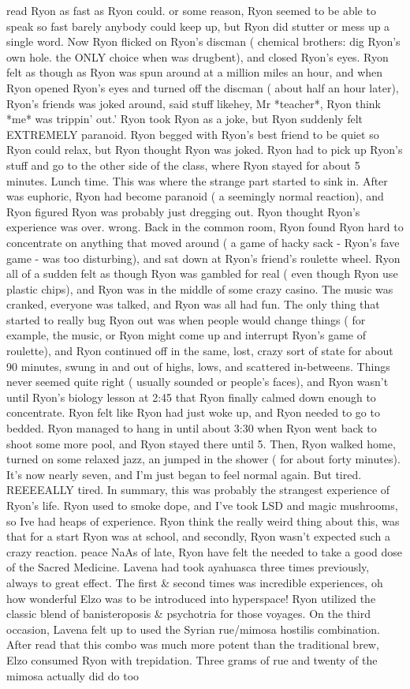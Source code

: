 \documentclass[12pt]{book}
\begin{document}
read Ryon as fast as Ryon could. or some reason, Ryon seemed to be able to speak so fast barely anybody could keep up, but Ryon did stutter or mess up a single word. Now Ryon flicked on Ryon's discman ( chemical brothers: dig Ryon's own hole. the ONLY choice when was drugbent), and closed Ryon's eyes. Ryon felt as though as Ryon was spun around at a million miles an hour, and when Ryon opened Ryon's eyes and turned off the discman ( about half an hour later), Ryon's friends was joked around, said stuff likehey, Mr *teacher*, Ryon think *me* was trippin' out.' Ryon took Ryon as a joke, but Ryon suddenly felt EXTREMELY paranoid. Ryon begged with Ryon's best friend to be quiet so Ryon could relax, but Ryon thought Ryon was joked. Ryon had to pick up Ryon's stuff and go to the other side of the class, where Ryon stayed for about 5 minutes. Lunch time. This was where the strange part started to sink in. After was euphoric, Ryon had become paranoid ( a seemingly normal reaction), and Ryon figured Ryon was probably just dregging out. Ryon thought Ryon's experience was over. wrong. Back in the common room, Ryon found Ryon hard to concentrate on anything that moved around ( a game of hacky sack - Ryon's fave game - was too disturbing), and sat down at Ryon's friend's roulette wheel. Ryon all of a sudden felt as though Ryon was gambled for real ( even though Ryon use plastic chips), and Ryon was in the middle of some crazy casino. The music was cranked, everyone was talked, and Ryon was all had fun. The only thing that started to really bug Ryon out was when people would change things ( for example, the music, or Ryon might come up and interrupt Ryon's game of roulette), and Ryon continued off in the same, lost, crazy sort of state for about 90 minutes, swung in and out of highs, lows, and scattered in-betweens. Things never seemed quite right ( usually sounded or people's faces), and Ryon wasn't until Ryon's biology lesson at 2:45 that Ryon finally calmed down enough to concentrate. Ryon felt like Ryon had just woke up, and Ryon needed to go to bedded. Ryon managed to hang in until about 3:30 when Ryon went back to shoot some more pool, and Ryon stayed there until 5. Then, Ryon walked home, turned on some relaxed jazz, an jumped in the shower ( for about forty minutes). It's now nearly seven, and I'm just began to feel normal again. But tired. REEEEALLY tired. In summary, this was probably the strangest experience of Ryon's life. Ryon used to smoke dope, and I've took LSD and magic mushrooms, so Ive had heaps of experience. Ryon think the really weird thing about this, was that for a start Ryon was at school, and secondly, Ryon wasn't expected such a crazy reaction. peace NaAs of late, Ryon have felt the needed to take a good dose of the Sacred Medicine. Lavena had took ayahuasca three times previously, always to great effect. The first \& second times was incredible experiences, oh how wonderful Elzo was to be introduced into hyperspace! Ryon utilized the classic blend of banisteroposis \& psychotria for those voyages. On the third occasion, Lavena felt up to used the Syrian rue/mimosa hostilis combination. After read that this combo was much more potent than the traditional brew, Elzo consumed Ryon with trepidation. Three grams of rue and twenty of the mimosa actually did do too 
\end{document}
